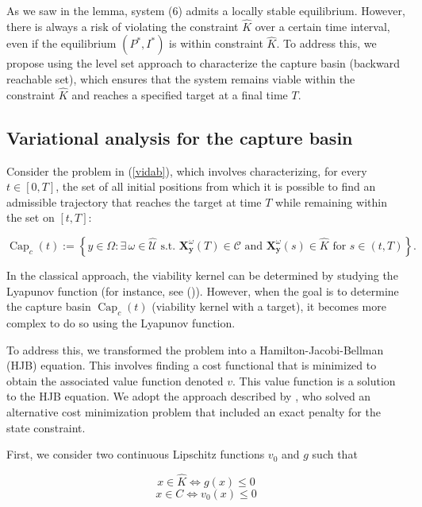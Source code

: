 \documentclass[]{interact}
\theoremstyle{plain}%
\theoremstyle{definition}
\theoremstyle{remark}
\begin{document}
As we saw in the lemma,  system (6) admits a locally stable equilibrium. However, there is always a risk of violating the constraint \( \hat{K} \) over a certain time interval, even if the equilibrium $(P^*, I^*)$ is within constraint \( \hat{K} \). To address this, we propose using the level set approach to characterize the capture basin (backward reachable set), which ensures that the system remains viable within the constraint \( \hat{K} \) and reaches a specified target at a final time \( T \). 

\subsection{Variational analysis for the capture basin}\label{short_viab}

Consider the problem in (\ref{vidab}), which involves characterizing, for every \(t \in [0, T]\), the set of all initial positions from which it is possible to find an admissible trajectory that reaches the target at time \(T\) while remaining within the set on \([t, T]\):

\[ 
\operatorname{Cap}_{c}(t) := \left\{ y \in \Omega: \exists\, \omega \in \hat{\mathcal{U}} \text{ s.t. } \mathbf{X}_{\mathbf{y}}^\omega(T) \in \mathcal{C} \text{ and } \mathbf{X}_{\mathbf{y}}^\omega(s) \in \hat{K} \text{ for } s \in (t, T) \right\}.
\]

In the classical approach, the viability kernel can be determined by studying the Lyapunov function (for instance, see (\cite{bayen2019minimal})). However, when the goal is to determine the capture basin $\operatorname{Cap}_{c}(t)$ (viability kernel with a target), it becomes more complex to do so using the Lyapunov function.

To address this, we transformed the problem into a Hamilton-Jacobi-Bellman (HJB) equation. This involves finding a cost functional that is minimized to obtain the associated value function denoted \( v \). This value function is a solution to the HJB equation. We adopt the approach described by \cite{altarovici2013general}, who solved an alternative cost minimization problem that included an exact penalty for the state constraint.

First, we consider two continuous Lipschitz functions $v_{0}$ and $g$ such that

\[ x \in \hat{K} \Leftrightarrow g(x) \leq 0 \]
\[ x \in C \Leftrightarrow v_{0}(x) \leq 0 \]
\end{document}

